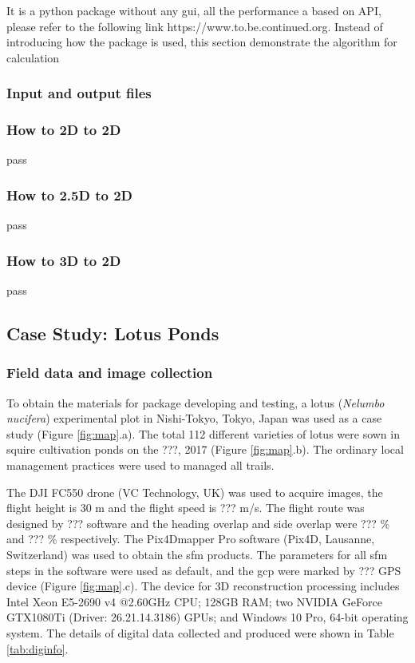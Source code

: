 \documentclass{configs/bmcart}
\begin{document}
It is a python package without any \acrfull*{gui}, all the performance a based on API, please refer to the following link https://www.to.be.continued.org. Instead of introducing how the package is used, this section demonstrate the algorithm for calculation

\subsubsection*{Input and output files}

\subsubsection*{How to 2D to 2D}
pass

\subsubsection*{How to 2.5D to 2D}
pass

\subsubsection*{How to 3D to 2D}
pass

\subsection*{Case Study: Lotus Ponds}

\subsubsection*{Field data and image collection}
To obtain the materials for package developing and testing, a lotus (\textit{Nelumbo nucifera}) experimental plot in Nishi-Tokyo, Tokyo, Japan was used as a case study (Figure \ref{fig:map}.a). The total 112 different varieties of lotus were sown in squire cultivation ponds on the ???, 2017 (Figure \ref{fig:map}.b). The ordinary local management practices were used to managed all trails.

The DJI FC550 drone (VC Technology, UK) was used to acquire images, the flight height is 30 m and the flight speed is ??? m/s. The flight route was designed by ??? software and the heading overlap and side overlap were ??? \% and ??? \% respectively. The Pix4Dmapper Pro software (Pix4D, Lausanne, Switzerland) was used to obtain the \acrshort*{sfm} products. The parameters for all \acrshort*{sfm} steps in the software were used as default, and the \acrfull*{gcp} were marked by ??? GPS device (Figure \ref{fig:map}.c). The device for 3D reconstruction processing includes Intel Xeon E5-2690 v4 @2.60GHz CPU; 128GB RAM; two NVIDIA GeForce GTX1080Ti (Driver: 26.21.14.3186) GPUs; and Windows 10 Pro, 64-bit operating system. The details of digital data collected and produced were shown in Table \ref{tab:diginfo}.
\end{document}
